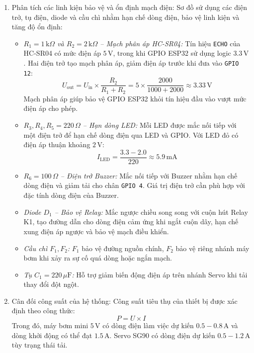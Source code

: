 \begin{enumerate}
    \item Phân tích các linh kiện bảo vệ và ổn định mạch điện:
    Sơ đồ sử dụng các điện trở, tụ điện, diode và cầu chì nhằm hạn chế dòng điện, bảo vệ linh kiện và tăng độ ổn định:
    \begin{itemize}
        \item \textit{$R_1 = 1\,\text{k}\Omega$ và $R_2 = 2\,\text{k}\Omega$ -- Mạch phân áp HC-SR04:} Tín hiệu \texttt{ECHO} của HC-SR04 có mức điện áp $5\,\text{V}$, trong khi GPIO ESP32 sử dụng logic $3.3\,\text{V}$. Hai điện trở tạo mạch phân áp, giảm điện áp trước khi đưa vào \texttt{GPIO 12}:
        \begin{equation}
            U_{\text{out}} = U_{\text{in}} \times \frac{R_2}{R_1 + R_2} = 5 \times \frac{2000}{1000 + 2000} \approx 3.33\,\text{V}
        \end{equation}
        Mạch phân áp giúp bảo vệ GPIO ESP32 khỏi tín hiệu đầu vào vượt mức điện áp cho phép.
        \item \textit{$R_3, R_4, R_5 = 220\,\Omega$ -- Hạn dòng LED:} Mỗi LED được mắc nối tiếp với một điện trở để hạn chế dòng điện qua LED và GPIO. Với LED đỏ có điện áp thuận khoảng $2\,\text{V}$:
        \begin{equation}
            I_{\text{LED}} = \frac{3.3 - 2.0}{220} \approx 5.9\,\text{mA}
        \end{equation}
        \item \textit{$R_6 = 100\,\Omega$ -- Điện trở Buzzer:} Mắc nối tiếp với Buzzer nhằm hạn chế dòng điện và giảm tải cho chân \texttt{GPIO 4}. Giá trị điện trở cần phù hợp với đặc tính dòng điện của Buzzer.
        \item \textit{Diode $D_1$ -- Bảo vệ Relay:} Mắc ngược chiều song song với cuộn hút Relay K1, tạo đường dẫn cho dòng điện cảm ứng khi ngắt cuộn dây, hạn chế xung điện áp ngược và bảo vệ mạch điều khiển.
        \item \textit{Cầu chì $F_1, F_2$:} $F_1$ bảo vệ đường nguồn chính, $F_2$ bảo vệ riêng nhánh máy bơm khi xảy ra sự cố quá dòng hoặc ngắn mạch.
        \item \textit{Tụ $C_1 = 220\,\mu\text{F}$:} Hỗ trợ giảm biến động điện áp trên nhánh Servo khi tải thay đổi đột ngột.
    \end{itemize}

    \item Cân đối công suất của hệ thống:
    Công suất tiêu thụ của thiết bị được xác định theo công thức:
    \begin{equation}
        P = U \times I
    \end{equation}
    Trong đó, máy bơm mini $5\,\text{V}$ có dòng điện làm việc dự kiến $0.5 - 0.8\,\text{A}$ và dòng khởi động có thể đạt $1.5\,\text{A}$. Servo SG90 có dòng điện dự kiến $0.5 - 1.2\,\text{A}$ tùy trạng thái tải.


\end{enumerate}
